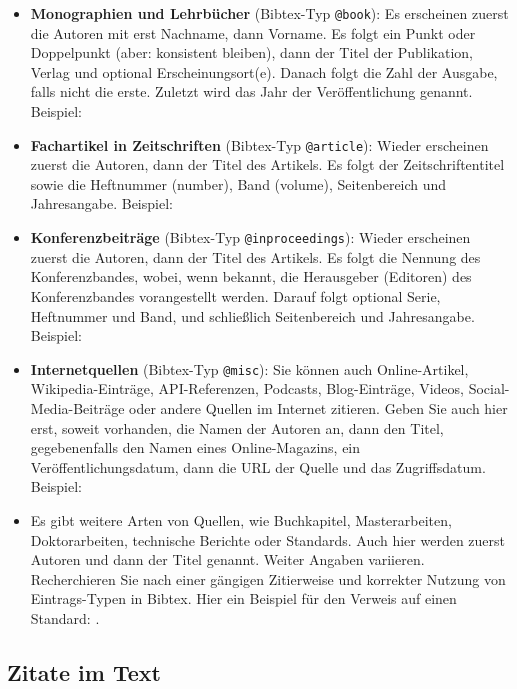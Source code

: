 \begin{itemize}
    
    \item \textbf{Monographien und Lehrbücher} (Bibtex-Typ \texttt{@book}): 
    Es erscheinen zuerst die Autoren mit erst Nachname, dann Vorname. Es folgt ein Punkt oder Doppelpunkt (aber: konsistent bleiben), dann der Titel der Publikation, Verlag und optional Erscheinungsort(e). Danach folgt die Zahl der Ausgabe, falls nicht die erste. Zuletzt wird das Jahr der Veröffentlichung genannt. Beispiel: \cite{Sutton2018}
    
    \item \textbf{Fachartikel in Zeitschriften} (Bibtex-Typ \texttt{@article}): 
    Wieder erscheinen zuerst die Autoren, dann der Titel des Artikels. Es folgt der Zeitschriftentitel sowie die Heftnummer (number),  Band (volume), Seitenbereich und Jahresangabe. Beispiel: \cite{Greenyer2013}
    
    \item \textbf{Konferenzbeiträge} (Bibtex-Typ \texttt{@inproceedings}): 
    Wieder erscheinen zuerst die Autoren, dann der Titel des Artikels. Es folgt die Nennung des Konferenzbandes, wobei, wenn bekannt, die Herausgeber (Editoren) des Konferenzbandes vorangestellt werden.
    Darauf folgt optional Serie, Heftnummer und Band, und schließlich Seitenbereich und Jahresangabe. Beispiel: \cite{DBLP:conf/calco/KonigWK23}
    
    \item \textbf{Internetquellen} (Bibtex-Typ \texttt{@misc}): Sie können auch Online-Artikel, Wikipedia-Einträge, API-Referenzen, Podcasts, Blog-Einträge, Videos, Social-Media-Beiträge oder andere Quellen im Internet zitieren.
    Geben Sie auch hier erst, soweit vorhanden, die Namen der Autoren an, dann den Titel, gegebenenfalls den Namen eines Online-Magazins, ein Veröffentlichungsdatum, dann die URL der Quelle und das Zugriffsdatum. Beispiel: \cite{Gebhard2021}
    
    \item Es gibt weitere Arten von Quellen, wie Buchkapitel, Masterarbeiten, Doktorarbeiten, technische Berichte oder Standards. Auch hier werden zuerst Autoren und dann der Titel genannt. Weiter Angaben variieren. Recherchieren Sie nach einer gängigen Zitierweise und korrekter Nutzung von Eintrags-Typen in Bibtex. Hier ein Beispiel für den Verweis auf einen Standard: \cite{UML251}.
\end{itemize}


\subsection{Zitate im Text}

